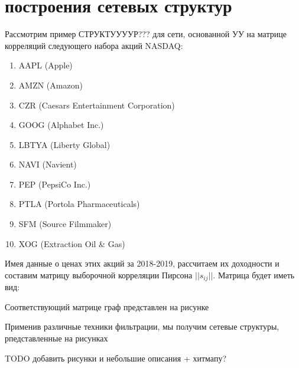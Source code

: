 \section{построения сетевых структур}
Рассмотрим пример СТРУКТУУУУР??? для сети, основанной УУ на матрице корреляций следующего набора акций NASDAQ: 
\begin{enumerate}
  \item AAPL (Apple)
  \item AMZN (Amazon)
  \item CZR (Caesars Entertainment Corporation)
  \item GOOG (Alphabet Inc.)
  \item LBTYA (Liberty Global)
  \item NAVI (Navient)
  \item PEP (PepsiCo Inc.)
  \item PTLA (Portola Pharmaceuticals)
  \item SFM (Source Filmmaker)
  \item XOG (Extraction Oil \& Gas)
\end{enumerate}
Имея данные о ценах этих акций за 2018-2019, рассчитаем их доходности и составим матрицу выборочной корреляции Пирсона $ ||s_{ij}|| $. Матрица будет иметь вид:

\bigskip
Соответствующий матрице граф представлен на рисунке 

Применив различные техники фильтрации, мы получим сетевые структуры, рпедставленные на рисунках 

TODO добавить рисунки и небольшие описания + хитмапу?